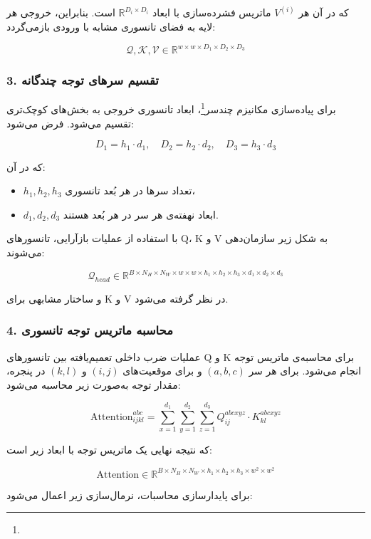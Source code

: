 که در آن هر $V^{(i)}$ ماتریس فشرده‌سازی با ابعاد $\mathbb{R}^{D_i \times D_i}$ است. بنابراین، خروجی هر لایه به فضای تانسوری مشابه با ورودی بازمی‌گردد:

\[
\mathcal{Q}, \mathcal{K}, \mathcal{V} \in \mathbb{R}^{w \times w \times D_1 \times D_2 \times D_3}
\]

\subsubsection*{3. تقسیم سرهای توجه چندگانه}

برای پیاده‌سازی مکانیزم چندسر\footnote{}، ابعاد تانسوری خروجی به بخش‌های کوچک‌تری تقسیم می‌شود. فرض می‌شود:

\[
D_1 = h_1 \cdot d_1, \quad D_2 = h_2 \cdot d_2, \quad D_3 = h_3 \cdot d_3
\]

که در آن:
\begin{itemize}
	\item $h_1, h_2, h_3$ تعداد سرها در هر بُعد تانسوری،
	\item $d_1, d_2, d_3$ ابعاد نهفته‌ی هر سر در هر بُعد هستند.
\end{itemize}

با استفاده از عملیات بازآرایی، تانسورهای Q، K و V به شکل زیر سازمان‌دهی می‌شوند:

\[
\mathcal{Q}_{head} \in \mathbb{R}^{B \times N_H \times N_W \times w \times w \times h_1 \times h_2 \times h_3 \times d_1 \times d_2 \times d_3}
\]

و ساختار مشابهی برای K و V در نظر گرفته می‌شود.

\subsubsection*{4. محاسبه ماتریس توجه تانسوری}

عملیات ضرب داخلی تعمیم‌یافته بین تانسورهای Q و K برای محاسبه‌ی ماتریس توجه انجام می‌شود. برای هر سر $(a,b,c)$ و برای موقعیت‌های $(i,j)$ و $(k,l)$ در پنجره، مقدار توجه به‌صورت زیر محاسبه می‌شود:

\[
\text{Attention}_{ijkl}^{abc} = \sum_{x=1}^{d_1} \sum_{y=1}^{d_2} \sum_{z=1}^{d_3} Q_{ij}^{abcxyz} \cdot K_{kl}^{abcxyz}
\]

که نتیجه نهایی یک ماتریس توجه با ابعاد زیر است:

\[
\text{Attention} \in \mathbb{R}^{B \times N_H \times N_W \times h_1 \times h_2 \times h_3 \times w^2 \times w^2}
\]

برای پایدارسازی محاسبات، نرمال‌سازی زیر اعمال می‌شود:

